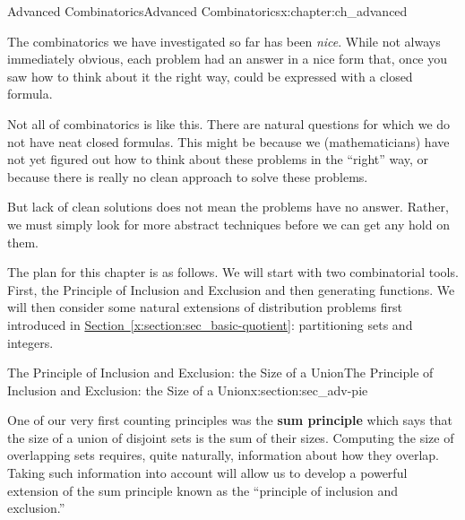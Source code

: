 \documentclass[oneside,10pt,]{book}
\newcommand{\terminology}[1]{\textbf{#1}}
\numberwithin{equation}{chapter}
\begin{document}
\begin{chapterptx}{Advanced Combinatorics}{}{Advanced Combinatorics}{}{}{x:chapter:ch_advanced}
\begin{introduction}{}%
The combinatorics we have investigated so far has been \emph{nice}.  While not always immediately obvious, each problem had an answer in a nice form that, once you saw how to think about it the right way, could be expressed with a closed formula.%
\par
Not all of combinatorics is like this.  There are natural questions for which we do not have neat closed formulas.  This might be because we (mathematicians) have not yet figured out how to think about these problems in the ``right'' way, or because there is really no clean approach to solve these problems.%
\par
But lack of clean solutions does not mean the problems have no answer.  Rather, we must simply look for more abstract techniques before we can get any hold on them.%
\par
The plan for this chapter is as follows.  We will start with two combinatorial tools.  First, the Principle of Inclusion and Exclusion  and then generating functions.   We will then consider some natural extensions of distribution problems first introduced in \hyperref[x:section:sec_basic-quotient]{Section~\ref{x:section:sec_basic-quotient}}: partitioning sets and integers.%
\end{introduction}%
%
%
\typeout{************************************************}
\typeout{************************************************}
%
\begin{sectionptx}{The Principle of Inclusion and Exclusion: the Size of a Union}{}{The Principle of Inclusion and Exclusion: the Size of a Union}{}{}{x:section:sec_adv-pie}
\begin{introduction}{}%
One of our very first counting principles was the \terminology{sum principle} which says that the size of a union of disjoint sets is the sum of their sizes. Computing the size of overlapping sets requires, quite naturally, information about how they overlap. Taking such information into account will allow us to develop a powerful extension of the sum principle known as the ``principle of inclusion and exclusion.''%
\end{introduction}%
%
%
\typeout{************************************************}

\end{sectionptx}
\end{chapterptx}
\end{document}
